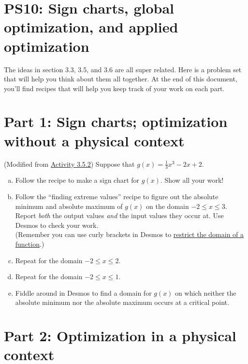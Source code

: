 
\usetikzlibrary{shapes.geometric, math}


%


\allowdisplaybreaks

\section{PS10: Sign charts, global optimization, and applied optimization}

The ideas in section 3.3, 3.5, and 3.6 are all super related. Here is a problem set that will help you think about them all together. At the end of this document, you'll find recipes that will help you keep track of your work on each part.

\section{Part 1: Sign charts; optimization without a physical context}

(Modified from \href{https://activecalculus.org/single/sec-3-5-optimization.html\#act-3-5-1}{Activity 3.5.2})
Suppose that $g(x) = \frac{1}{3}x^3 - 2x + 2$.

\begin{enumerate}[(a), leftmargin=15pt]
    \item Follow the recipe to make a sign chart for $g(x)$. Show all your work!
    \item Follow the ``finding extreme values'' recipe to figure out the absolute minimum and absolute maximum of $g(x)$ on the domain $-2 \leq x \leq 3$. Report \textit{both} the output values \textit{and} the input values they occur at. Use Desmos to check your work.\\(Remember you can use curly brackets in Desmos to \href{https://help.desmos.com/hc/en-us/articles/4407885334285-Inequalities-and-Restrictions}{restrict the domain of a function}.)
    \item Repeat for the domain $-2 \leq x \leq 2$. 
    \item Repeat for the domain $-2 \leq x \leq 1$. 
    \item Fiddle around in Desmos to find a domain for $g(x)$ on which neither the absolute minimum nor the absolute maximum occurs at a critical point.
\end{enumerate}

\section{Part 2: Optimization in a physical context}

